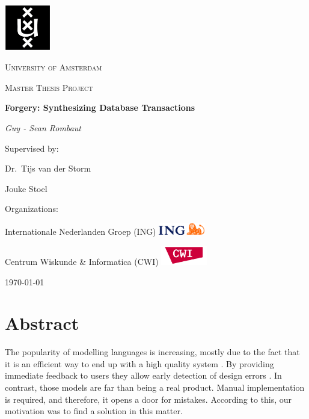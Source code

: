 \documentclass[oneside]{book}
\begin{document}
\begin{titlepage}
	\centering
	\includegraphics[width=0.15\textwidth]{logo-uva}\par\vspace{2.5mm}
	{\scshape\LARGE University of Amsterdam \par}
	\vspace{2mm}
	{\scshape\Large Master Thesis Project\par}
	\vspace{1.5cm}
	{\Huge\bfseries Forgery: Synthesizing Database Transactions\par}
	\vspace{1cm}
	{\Large\itshape Guy - Sean Rombaut\par}
	\vfill
	Supervised by:\par
	Dr.~Tijs van der Storm\par
	Jouke Stoel\par
	\vspace{1cm}
	Organizations:\par
		 Internationale Nederlanden Groep (ING) \hfill  \includegraphics[width=0.15\textwidth]{ING}\par
	 Centrum Wiskunde \& Informatica (CWI)  \hfill  \includegraphics[width=0.15\textwidth]{CWIlogo}

	\vfill

	{\large \today\par}
\end{titlepage}

\tableofcontents
\newpage

\chapter{Abstract}
The popularity of modelling languages is increasing, mostly due to the fact that it is an efficient way to end up with a high quality system \cite[p. ~6]{abstractions}. By providing immediate feedback to users they allow early detection of design errors \cite{lightning}. In contrast, those models are far than being a real product. Manual implementation is required, and therefore, it opens a door for mistakes. According to this, our motivation was to find a solution in this matter.\\ 
\end{document}
